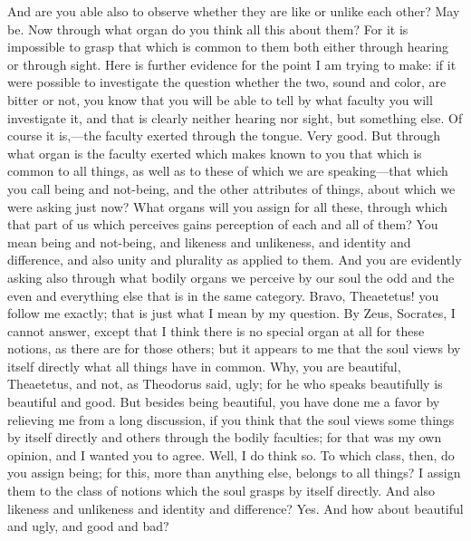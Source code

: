 \documentclass[letterpaper,12pt]{article}
\newcommand{\stephpag}[1]{\marginnote{\small\itshape\fontfamily{ppl}\selectfont #1}}
\begin{document}
\begin{drama}
\socratesspeaks
And are you able also to observe whether they are like or unlike each other?
\theaetetusspeaks
May be.
\socratesspeaks
Now through what organ do you think all this about them? For it is impossible to grasp that which is common to them both either through hearing or through sight. Here is further evidence for the point I am trying to make: if it were possible to investigate the question whether the two, sound and color, are bitter or not, you know that you will be able to tell by what faculty you will investigate it, and that is clearly \stephpag{c} neither hearing nor sight, but something else.
\theaetetusspeaks
Of course it is,—the faculty exerted through the tongue.
\socratesspeaks
Very good. But through what organ is the faculty exerted which makes known to you that which is common to all things, as well as to these of which we are speaking—that which you call being and not-being, and the other attributes of things, about which we were asking just now? What organs will you assign for all these, through which that part of us which perceives gains perception of each and all of them?
\theaetetusspeaks
You mean being and not-being, and likeness and unlikeness, and identity and difference, \stephpag{d} and also unity and plurality as applied to them. And you are evidently asking also through what bodily organs we perceive by our soul the odd and the even and everything else that is in the same category.
\socratesspeaks
Bravo, Theaetetus! you follow me exactly; that is just what I mean by my question.
\theaetetusspeaks
By Zeus, Socrates, I cannot answer, except that I think there is no special organ at all for these notions, as there are for those others; but it appears to me that the soul views by itself directly \stephpag{e} what all things have in common.
\socratesspeaks
Why, you are beautiful, Theaetetus, and not, as Theodorus said, ugly; for he who speaks beautifully is beautiful and good. But besides being beautiful, you have done me a favor by relieving me from a long discussion, if you think that the soul views some things by itself directly and others through the bodily faculties; for that was my own opinion, and I wanted you to agree. \stephpag{186 a}
\theaetetusspeaks
Well, I do think so.
\socratesspeaks
To which class, then, do you assign being; for this, more than anything else, belongs to all things?
\theaetetusspeaks
I assign them to the class of notions which the soul grasps by itself directly.
\socratesspeaks
And also likeness and unlikeness and identity and difference?
\theaetetusspeaks
Yes.
\socratesspeaks
And how about beautiful and ugly, and good and bad?

\end{drama}
\end{document}

